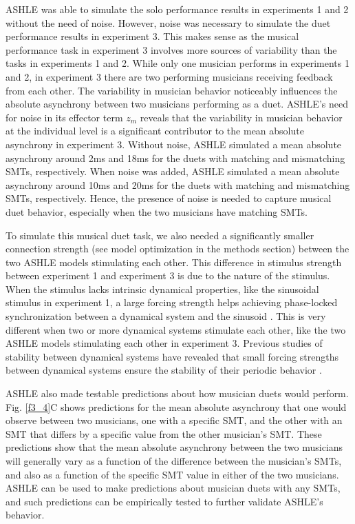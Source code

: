 \documentclass{report}
\begin{document}
ASHLE was able to simulate the solo performance results in experiments 1 and 2 without the need of noise. However, noise was necessary to simulate the duet performance results in experiment 3. This makes sense as the musical performance task in experiment 3 involves more sources of variability than the tasks in experiments 1 and 2. While only one musician performs in experiments 1 and 2, in experiment 3 there are two performing musicians receiving feedback from each other. The variability in musician behavior noticeably influences the absolute asynchrony between two musicians performing as a duet. ASHLE's need for noise in its effector term $z_m$ reveals that the variability in musician behavior at the individual level is a significant contributor to the mean absolute asynchrony in experiment 3. Without noise, ASHLE simulated a mean absolute asynchrony around 2ms and 18ms for the duets with matching and mismatching SMTs, respectively. When noise was added, ASHLE simulated a mean absolute asynchrony around 10ms and 20ms for the duets with matching and mismatching SMTs, respectively. Hence, the presence of noise is needed to capture musical duet behavior, especially when the two musicians have matching SMTs.

To simulate this musical duet task, we also needed a significantly smaller connection strength (see model optimization in the methods section) between the two ASHLE models stimulating each other. This difference in stimulus strength between experiment 1 and experiment 3 is due to the nature of the stimulus. When the stimulus lacks intrinsic dynamical properties, like the sinusoidal stimulus in experiment 1, a large forcing strength helps achieving phase-locked synchronization between a dynamical system and the sinusoid \cite{kim2015signal}. This is very different when two or more dynamical systems stimulate each other, like the two ASHLE models stimulating each other in experiment 3. Previous studies of stability between dynamical systems have revealed that small forcing strengths between dynamical systems ensure the stability of their periodic behavior \cite{kim2015signal}.

ASHLE also made testable predictions about how musician duets would perform. Fig.{} \ref{f3_4}C shows predictions for the mean absolute asynchrony that one would observe between two musicians, one with a specific SMT, and the other with an SMT that differs by a specific value from the other musician's SMT. These predictions show that the mean absolute asynchrony between the two musicians will generally vary as a function of the difference between the musician's SMTs, and also as a function of the specific SMT value in either of the two musicians. ASHLE can be used to make predictions about musician duets with any SMTs, and such predictions can be empirically tested to further validate ASHLE's behavior.
\end{document}
